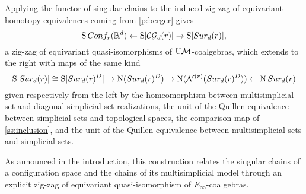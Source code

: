 Applying the functor of singular chains to the induced zig-zag of equivariant homotopy equivalences coming from \cref{p:berger} gives
\[
\operatorname{S}Conf_{r}(\mathbb{R}^{d}) \leftarrow
\operatorname{S}\lvert\mathcal{CG}_{d}(r)\rvert \to
\operatorname{S}\lvert Sur_{d}(r)\rvert,
\]
a zig-zag of equivariant quasi-isomorphisms of $\mathrm{U}\mathcal{M}$-coalgebras, which extends to the right with maps of the same kind
\[
\operatorname{S}\lvert Sur_{d}(r)\rvert \cong
\operatorname{S} \lvert Sur_{d}(r)^{D}\rvert \to
\operatorname{N}(Sur_{d}(r)^D) \to
\operatorname{N}(\mathcal{N}^{(r)}(Sur_{d}(r)^D)) \leftarrow
\operatorname{N}Sur_{d}(r)
\]
given respectively from the left by the homeomorphism between multisimplicial set and diagonal simplicial set realizations, the unit of the Quillen equivalence between simplicial sets and topological spaces, the comparison map of \cref{ss:inclusion}, and the unit of the Quillen equivalence between multisimplicial sets and simplicial sets.

As announced in the introduction, this construction relates the singular chains of a configuration space and the chains of its multisimplicial model through an explicit zig-zag of equivariant quasi-isomorphism of $E_\infty$-coalgebras.